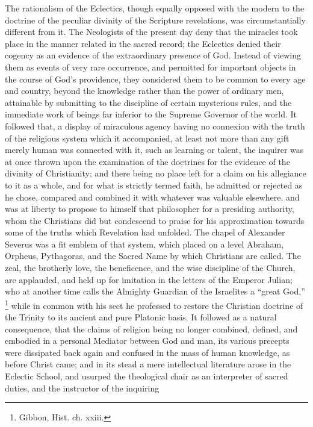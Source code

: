 The rationalism of the Eclectics, though equally opposed with the
modern to the doctrine of the peculiar divinity of the Scripture
revelations, was circumstantially different from it. The Neologists of
the present day deny that the miracles took place in the manner
related in the sacred record; the Eclectics denied their cogency as an
evidence of the extraordinary presence of God. Instead of viewing them
as events of very rare occurrence, and permitted for important
objects in the course of God's providence, they considered them to be
common to every age and country, beyond the knowledge rather than the
power of ordinary men, attainable by submitting to the discipline of
certain mysterious rules, and the immediate work of beings far
inferior to the Supreme Governor of the world. It followed that, a
display of miraculous agency having no connexion with the truth of the
religious system which it accompanied, at least not more than any gift
merely human was connected with it, such as learning or talent, the
inquirer was at once thrown upon the examination of the doctrines for
the evidence of the divinity of Christianity; and there being no place
left for a claim on his allegiance to it as a whole, and for what is
strictly termed faith, he admitted or rejected as he chose, compared
and combined it with whatever was valuable elsewhere, and was at
liberty to propose to himself that philosopher for a presiding
authority, whom the Christians did but condescend to praise for his
approximation towards some of the truths which Revelation had
unfolded. The chapel of Alexander Severus was a fit emblem of that
system, which placed on a level Abraham, Orpheus, Pythagoras, and the
Sacred Name by which Christians are called. The zeal, the brotherly
love, the beneficence, and the wise discipline of the Church, are
applauded, and held up for imitation in the letters of the Emperor
Julian; who at another time calls the Almighty Guardian of the
Israelites a ``great God,'' \footnote{Gibbon, Hist. ch. xxiii.} while in common with his sect he professed to restore the
Christian doctrine of the Trinity to its ancient and pure
Platonic basis. It followed as a natural consequence, that the claims
of religion being no longer combined, defined, and embodied in a
personal Mediator between God and man, its various precepts were
dissipated back again and confused in the mass of human knowledge, as
before Christ came; and in its stead a mere intellectual literature
arose in the Eclectic School, and usurped the theological chair as an
interpreter of sacred duties, and the instructor of the inquiring
